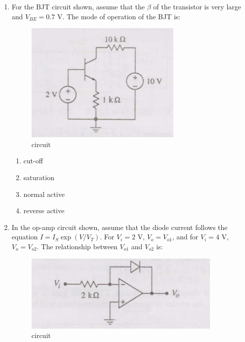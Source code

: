 \documentclass[journal,12pt,onecolumn]{IEEEtran}
\theoremstyle{remark}
\begin{document}
\begin{enumerate}
\begin{multicols}{4}
\begin{enumerate}
  \item $-2$ V
  \item $-1$ V
  \item $-0.5$ V
  \item $0.5$ V
\end{enumerate}
\end{multicols}

\item For the BJT circuit shown, assume that the $\beta$ of the transistor is very large and $V_{BE} = 0.7\text{ V}$. The mode of operation of the BJT is: 

\begin{figure}[H]
    \centering
    \includegraphics[width=0.4\linewidth]{Q37.png}
    \caption{circuit}
    \label{fig:full_wave}
\end{figure}
\hfill{}
\begin{multicols}{4}
\begin{enumerate}
  \item cut-off
  \item saturation
  \item normal active
  \item reverse active
\end{enumerate}
\end{multicols}

\item In the op-amp circuit shown, assume that the diode current follows the equation $I = I_S \exp(V/V_T)$. For $V_i = 2\text{ V}$, $V_o = V_{o1}$, and for $V_i = 4\text{ V}$, $V_o = V_{o2}$. The relationship between $V_{o1}$ and $V_{o2}$ is: 

\begin{figure}[H]
    \centering
    \includegraphics[width=0.4\linewidth]{Q38.png}
    \caption{circuit}
    \label{fig:full_wave}
\end{figure}


\end{enumerate}
\end{document}
